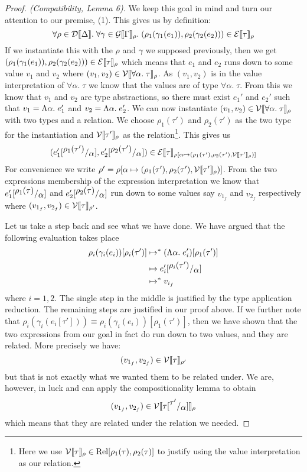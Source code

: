\begin{proof}[Proof. (Compatibility, Lemma 6)]
We keep this goal in mind and turn our attention to our premise, (1). This gives us by definition:
\[
\forall \rho \in \dpred{\Delta}. \; \forall \gamma \in \gprep{\Gamma}. \; (\rho_1(\gamma_1(e_1)),\rho_2(\gamma_2(e_2))) \in \eprep{\tau}
\]
If we instantiate this with the $\rho$ and $\gamma$ we supposed previously, then we get $(\rho_1(\gamma_1(e_1)),\rho_2(\gamma_2(e_2))) \in \eprep{\tau}$ which means that $e_1$ and $e_2$ runs down to some value $v_1$ and $v_2$ where $(v_1,v_2) \in \vprep{\forall \alpha. \; \tau}$. As $(v_1,v_2)$ is in the value interpretation of $\forall \alpha. \; \tau$ we know that the values are of type $\forall \alpha. \; \tau$. From this we know that $v_1$ and $v_2$ are type abstractions, so there must exist $e_1'$ and $e_2'$ such that $v_1 = \tLabs{e_1'}$ and $v_2 = \tLabs{e_2'}$. We can now instantiate $(v_1,v_2) \in \vprep{\forall \alpha. \; \tau}$ with two types and a relation. We choose $\rho_1(\tau')$ and $\rho_2(\tau')$ as the two type for the instantiation and $\vprep{\tau'}$ as the relation\footnote{Here we use $\vprep{\tau} \in \Rel[\rho_1(\tau),\rho_2(\tau)]$ to justify using the value interpretation as our relation.}. This gives us
\[
  (\subst{e_1'}{\rho_1(\tau')}{\alpha},\subst{e_2'}{\rho_2(\tau')}{\alpha}) \in \eprep[\extsub{\rho}{\alpha}{(\rho_1(\tau'),\rho_2(\tau'),\vprep{\tau'})}]{\tau}
\]
For convenience we write $\rho' = \extsub{\rho}{\alpha}{(\rho_1(\tau'),\rho_2(\tau'),\vprep{\tau'})}$. From the two expressions membership of the expression interpretation we know that $\subst{e_1'}{\rho_1(\tau)}{\alpha}$ and $\subst{e_2'}{\rho_2(\tau)}{\alpha}$ run down to some values say $v_{1_f}$ and $v_{2_f}$ respectively where $(v_{1_f},v_{2_f}) \in \vprep[\rho']{\tau}$.

Let us take a step back and see what we have done. We have argued that the following evaluation takes place
\begin{align*}
  \rho_i (\gamma_i(e_i)) [\rho_i(\tau')] & \evaltos (\tLabs{e_i'})[\rho_1(\tau')] \\
                      & \evalto \subst{e_i'}{\rho_i(\tau')}{\alpha} \\
                      & \evaltos v_{i_f}
\end{align*}
where $i=1,2$. The single step in the middle is justified by the type application reduction. The remaining steps are justified in our proof above. If we further note that $\rho_i (\gamma_i (e_i [\tau'])) \equiv  \rho_i (\gamma_i (e_i))[\rho_1(\tau')]$, then we have shown that the two expressions from our goal in fact do run down to two values, and they are related. More precisely we have:
\[
  (v_{1_f},v_{2_f}) \in \vprep[\rho']{\tau}
\]
but that is not exactly what we wanted them to be related under. We are, however, in luck and can apply the compositionality lemma to obtain
\[
  (v_{1_f},v_{2_f}) \in \vprep{\subst{\tau}{\tau'}{\alpha}}
\]
which means that they are related under the relation we needed.
\end{proof}

